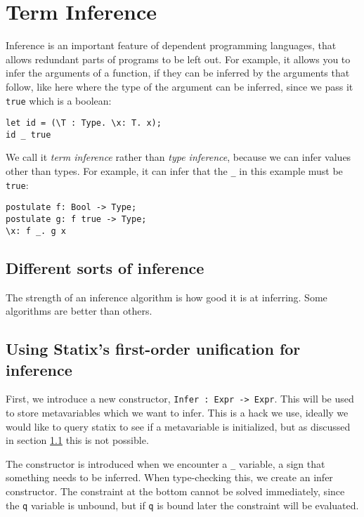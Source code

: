 \chapter{Term Inference}

Inference is an important feature of dependent programming languages, that allows redundant parts of programs to be left out. For example, it allows you to infer the arguments of a function, if they can be inferred by the arguments that follow, like here where the type of the argument can be inferred, since we pass it \verb|true| which is a boolean:
\begin{lstlisting}
let id = (\T : Type. \x: T. x);
id _ true
\end{lstlisting}

We call it \emph{term inference} rather than \emph{type inference}, because we can infer values other than types. For example, it can infer that the \verb|_| in this example must be \verb|true|:
\begin{lstlisting}
postulate f: Bool -> Type;
postulate g: f true -> Type;
\x: f _. g x
\end{lstlisting}

\section{Different sorts of inference}
\label{strength-inference}

The strength of an inference algorithm is how good it is at inferring. Some algorithms are better than others. \cite{typeinference}

\section{Using Statix's first-order unification for inference}

First, we introduce a new constructor, \verb|Infer : Expr -> Expr|. This will be used to store metavariables which we want to infer. This is a hack we use, ideally we would like to query statix to see if a metavariable is initialized, but as discussed in section \ref{strength-inference} this is not possible. 

The constructor is introduced when we encounter a \verb|_| variable, a sign that something needs to be inferred. When type-checking this, we create an infer constructor. The constraint at the bottom cannot be solved immediately, since the \verb|q| variable is unbound, but if \verb|q| is bound later the constraint will be evaluated.


